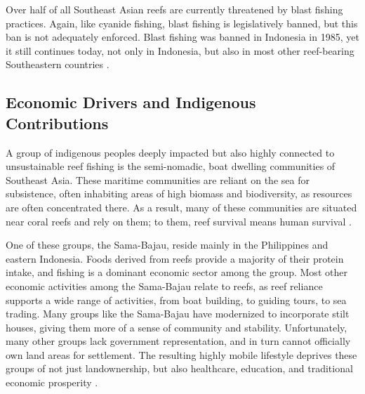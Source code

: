 \documentclass{book}\usepackage{knitr}
\begin{document}
\begin{knitrout}
\begin{kframe}
Over half of all Southeast Asian reefs are currently threatened by blast fishing practices. Again, like cyanide fishing, blast fishing is legislatively banned, but this ban is not adequately enforced. Blast fishing was banned in Indonesia in 1985, yet it still continues today, not only in Indonesia, but also in most other reef-bearing Southeastern countries \citep{https://doi.org/10.1890/1051-0761(2006)016[1631:RFBFOC]2.0.CO;2}. 


\subsection{Economic Drivers and Indigenous Contributions}

A group of indigenous peoples deeply impacted but also highly connected to unsustainable reef fishing is the semi-nomadic, boat dwelling communities of Southeast Asia. These maritime communities are reliant on the sea for subsistence, often inhabiting areas of high biomass and biodiversity, as resources are often concentrated there. As a result, many of these communities are situated near coral reefs and rely on them; to them, reef survival means human survival \citep{boatpeople}. 

One of these groups, the Sama-Bajau, reside mainly in the Philippines and eastern Indonesia. Foods derived from reefs provide a majority of their protein intake, and fishing is a dominant economic sector among the group. Most other economic activities among the Sama-Bajau relate to reefs, as reef reliance supports a wide range of activities, from boat building, to guiding tours, to sea trading. Many groups like the Sama-Bajau have modernized to incorporate stilt houses, giving them more of a sense of community and stability. Unfortunately, many other groups lack government representation, and in turn cannot officially own land areas for settlement. The resulting highly mobile lifestyle deprives these groups of not just landownership, but also healthcare, education, and traditional economic prosperity \citep{boatpeople}.


\end{kframe}
\end{knitrout}
\end{document}
